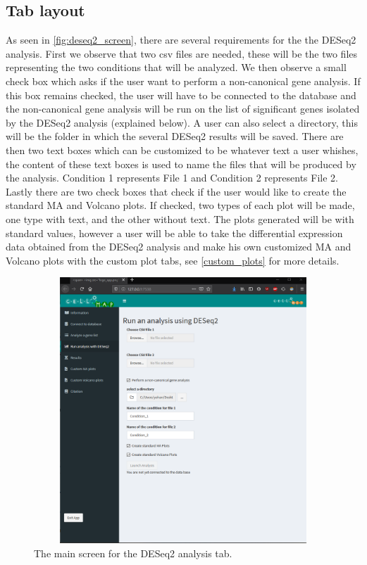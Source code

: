 \documentclass[11pt]{article}
\begin{document}
\subsection{Tab layout \label{deseq2_layout}}
As seen in \autoref{fig:deseq2_screen}, there are several requirements for the the DESeq2 analysis. First we observe that two csv files are needed, these will be the two files representing the two conditions that will be analyzed. We then observe a small check box which asks if the user want to perform a non-canonical gene analysis. If this box remains checked, the user will have to be connected to the database and the non-canonical gene analysis will be run on the list of significant genes isolated by the DESeq2 analysis (explained below). A user can also select a directory, this will be the folder in which the several DESeq2 results will be saved.
There are then two text boxes which can be customized to be whatever text a user whishes, the content of these text boxes is used to name the files that will be produced by the analysis. Condition 1 represents File 1 and Condition 2 represents File 2.
Lastly there are two check boxes that check if the user would like to create the standard MA and Volcano plots. If checked, two types of each plot will be made, one type with text, and the other without text. The plots generated will be with standard values, however a user will be able to take the differential expression data obtained from the DESeq2 analysis and make his own customized MA and Volcano plots with the custom plot tabs, see \autoref{custom_plots} for more details.

\begin{figure}[h!]
\centering
\includegraphics[width=15cm,height=10cm,keepaspectratio]{deseq2_screen.png}
\caption{The main screen for the DESeq2 analysis tab.}
\label{fig:deseq2_screen}
\end{figure}
\end{document}
